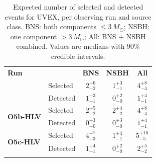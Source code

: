 \begin{table}
\renewcommand\arraystretch{1.3}
\setlength{\tabcolsep}{0.3cm}
\centering
\caption{Expected number of selected and detected events for UVEX, per observing run and source class. BNS: both components $\leq 3\,M_\odot$; NSBH: one component $> 3\,M_\odot$; All: BNS $+$ NSBH combined. Values are medians with 90\% credible intervals.}
\label{tab:uvex--selected-detected-1yr}
\begin{tabular}{llccc}
\Xhline{3\arrayrulewidth}
\textbf{Run} & & \textbf{BNS} & \textbf{NSBH} & \textbf{All} \\
\Xhline{3\arrayrulewidth}
\multirow{2}{*}{\textbf{O5a-HLV}} & Selected & $2_{-2}^{+6}$ & $1_{-1}^{+3}$ & $4_{-4}^{+8}$ \\
 & Detected & $1_{-1}^{+3}$ & $0_{-0}^{+2}$ & $1_{-1}^{+4}$ \\
\hline
\multirow{2}{*}{\textbf{O5b-HLV}} & Selected & $2_{-2}^{+5}$ & $2_{-2}^{+4}$ & $4_{-4}^{+8}$ \\
 & Detected & $0_{-0}^{+3}$ & $0_{-0}^{+3}$ & $1_{-1}^{+4}$ \\
\hline
\multirow{2}{*}{\textbf{O5c-HLV}} & Selected & $4_{-3}^{+7}$ & $1_{-1}^{+4}$ & $5_{-5}^{+10}$ \\
 & Detected & $1_{-1}^{+4}$ & $0_{-0}^{+2}$ & $2_{-2}^{+5}$ \\
\Xhline{3\arrayrulewidth}
\end{tabular}
\end{table}
